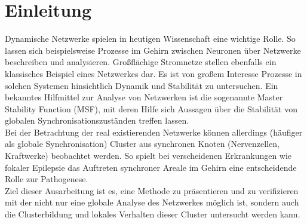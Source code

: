 \section{Einleitung}\label{einleitung}
Dynamische Netzwerke spielen in heutigen Wissenschaft eine wichtige Rolle. So lassen sich beispielsweise Prozesse im Gehirn zwischen Neuronen über Netzwerke beschreiben und analysieren. Großflächige Stromnetze stellen ebenfalls ein klassisches Beispiel eines Netzwerkes dar. Es ist von großem Interesse Prozesse in solchen Systemen hinsichtlich Dynamik und Stabilität zu untersuchen. Ein bekanntes Hilfmittel zur Analyse von Netzwerken ist die sogenannte Master Stability Function (MSF), mit deren Hilfe sich Aussagen über die Stabilität von globalen Synchronisationszuständen treffen lassen.\\
Bei der Betrachtung der real existierenden Netzwerke können allerdings (häufiger als globale Synchronisation) Cluster aus synchronen Knoten (Nervenzellen, Kraftwerke) beobachtet werden. So spielt bei verscheidenen Erkrankungen wie fokaler Epilepsie das Auftreten synchroner Areale im Gehirn eine entscheidende Rolle zur Pathogenese.\\
Ziel dieser Ausarbeitung ist es, eine Methode zu präsentieren und zu verifizieren mit der nicht nur eine globale Analyse des Netzwerkes möglich ist, sondern auch die Clusterbildung und lokales Verhalten dieser Cluster untersucht werden kann.